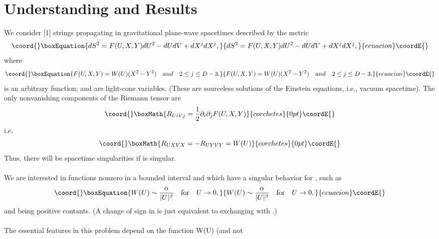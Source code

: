 \documentclass[12pt,a4paper]{article}
\begin{document}
\section{Understanding and Results}
We consider [1] strings propagating in gravitational plane-wave spacetimes 
described by the metric
\begin{equation}\coord{}\boxEquation{
dS^2 = F(U,X,Y)dU^2 - dU dV + dX^j dX^j,
}{
dS^2 = F(U,X,Y)dU^2 - dU dV + dX^j dX^j,
}{ecuacion}\coordE{}\end{equation}
where
\begin{equation}\coord{}\boxEquation{
 F(U,X,Y) = W(U)(X^2-Y^2)\quad and \quad 2 \le j \le D-3. 
}{
 F(U,X,Y) = W(U)(X^2-Y^2)\quad and \quad 2 \le j \le D-3. 
}{ecuacion}\coordE{}\end{equation}
\coordHE{} is an 
arbitrary function; \coordHE{} and \coordHE{} are light-cone variables. (These are 
sourceless solutions of the Einstein equations, i.e., vacuum spacetime). The 
only nonvanishing components of the Riemann tensor are 
\begin{displaymath}\coord{}\boxMath{
R_{UiVj} = \frac{1}{2} \partial _i \partial _j F(U,X,Y)
}{corchetes}{0pt}\coordE{}\end{displaymath}
i.e.
\begin{displaymath}\coord{}\boxMath{
R_{UXVX} = - R_{UYVY} = W(U)
}{corchetes}{0pt}\coordE{}\end{displaymath}
Thus, there will be spacetime singularities if \coordHE{} is singular. \\ \\
We are interested in functions \coordHE{} nonzero in a bounded interval 
\coordHE{} and which have a singular behavior for \coordHE{}, 
such as 
\begin{equation}\coord{}\boxEquation{
W(U) \sim \frac{\alpha }{|U|^\beta }\quad \mathrm{for}\quad U \rightarrow 0, 
}{
W(U) \sim \frac{\alpha }{|U|^\beta }\quad \mathrm{for}\quad U \rightarrow 0, 
}{ecuacion}\coordE{}\end{equation}
\myHighlight{$\alpha $}\coordHE{} and \myHighlight{$\beta $}\coordHE{} being positive contants. (A change of sign in 
\myHighlight{$\alpha $}\coordHE{} is just equivalent to exchanging \coordHE{} with \coordHE{}.) \\ \\ 
The essential features in this problem depend on the function W(U) (and not 
\end{document}
